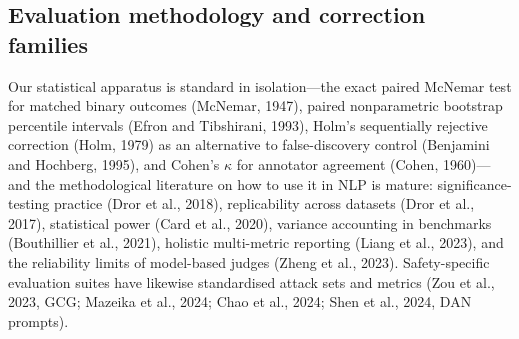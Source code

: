 \subsection{Evaluation methodology and correction families}

Our statistical apparatus is standard in isolation---the exact paired McNemar
test for matched binary outcomes (McNemar, 1947), paired nonparametric bootstrap
percentile intervals (Efron and Tibshirani, 1993), Holm's sequentially rejective
correction (Holm, 1979) as an alternative to false-discovery control
(Benjamini and Hochberg, 1995), and Cohen's $\kappa$ for annotator agreement
(Cohen, 1960)---and the methodological literature on how to use it in NLP is
mature: significance-testing practice (Dror et al., 2018), replicability across
datasets (Dror et al., 2017), statistical power (Card et al., 2020), variance
accounting in benchmarks (Bouthillier et al., 2021), holistic multi-metric
reporting (Liang et al., 2023), and the reliability limits of model-based judges
(Zheng et al., 2023). Safety-specific evaluation suites have likewise
standardised attack sets and metrics (Zou et al., 2023, GCG;
Mazeika et al., 2024; Chao et al., 2024; Shen et al., 2024, DAN prompts).

